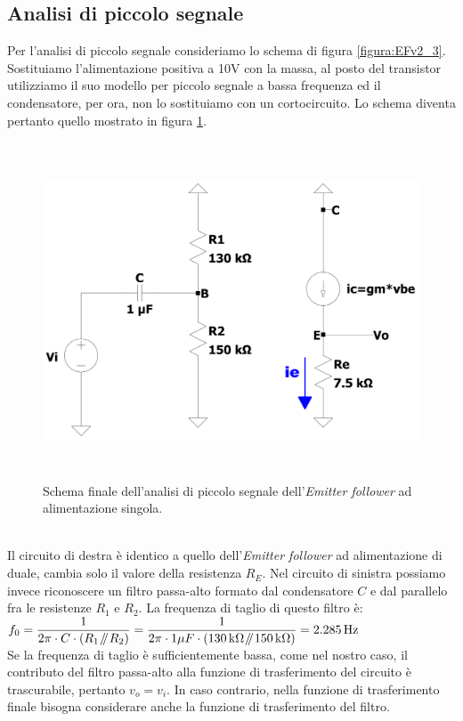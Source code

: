 \documentclass{report}
\newcommand{\parallelsum}{\mathbin{\!/\mkern-5mu/\!}}
\begin{document}
\subsection{Analisi di piccolo segnale}  
Per l'analisi di piccolo segnale consideriamo lo schema di figura \ref{figura:EFv2_3}. Sostituiamo l'alimentazione positiva a 10V con la massa, al posto del transistor utilizziamo il suo modello per piccolo segnale a bassa frequenza ed il condensatore, per ora, non lo sostituiamo con un cortocircuito. Lo schema diventa pertanto quello mostrato in figura \ref{figura:EFv2_3_ps}.
\begin{figure}[h]
\centering
\includegraphics[height=10cm]{immagini/EFv2_3_ps}
\caption{Schema finale dell'analisi di piccolo segnale dell'\textit{Emitter follower} ad alimentazione singola.}
\label{figura:EFv2_3_ps}
\end{figure}
\\Il circuito di destra è identico a quello dell'\textit{Emitter follower} ad alimentazione di duale, cambia solo il valore della resistenza $R_E$. Nel circuito di sinistra possiamo invece riconoscere un filtro passa-alto formato dal condensatore $C$ e dal parallelo fra le resistenze $R_1$ e $R_2$. La frequenza di taglio di questo filtro è:
\\[2pt]\indent $\displaystyle{f_0=\frac{1}{2\pi\cdot C\cdot (R_1\parallelsum R_2)}=\frac{1}{2\pi\cdot 1\mu F\cdot(\SI{130}{k\ohm}\parallelsum\SI{150}{k\ohm})}=\SI{2.285}{\hertz}}$
\\[2pt]Se la frequenza di taglio è sufficientemente bassa, come nel nostro caso, il contributo del filtro passa-alto alla funzione di trasferimento del circuito è trascurabile, pertanto $v_o=v_i$. In caso contrario, nella funzione di trasferimento finale bisogna considerare anche la funzione di trasferimento del filtro.
\end{document}
